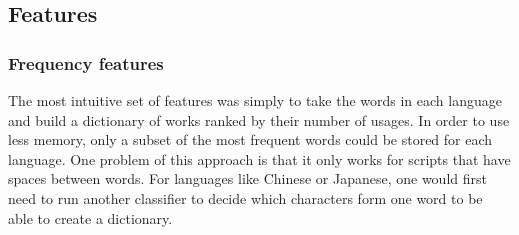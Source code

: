 \documentclass[11pt]{article}
\begin{document}
\subsection{Features}
\subsubsection{Frequency features}
The most intuitive set of features was simply to take the
words in each language and build a dictionary of works
ranked by their number of usages. In order to use less memory,
only a subset of the most frequent words could be stored
for each language. 
One problem of this approach is that it only works for scripts
that have spaces between words. For languages like Chinese
or Japanese, one would first need to run another classifier to
decide which characters form one word to be able to create
a dictionary.
\end{document}

